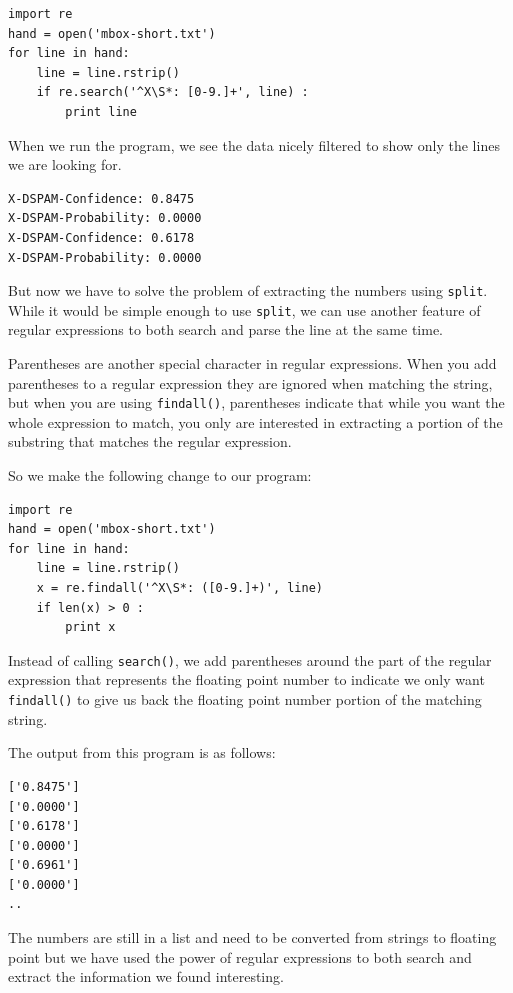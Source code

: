 \documentclass[11pt]{book}
\begin{document}
\beforeverb
\begin{verbatim}
import re
hand = open('mbox-short.txt')
for line in hand:
    line = line.rstrip()
    if re.search('^X\S*: [0-9.]+', line) :
        print line
\end{verbatim}
\afterverb
%
When we run the program, we see the data nicely filtered to show 
only the lines we are looking for.

\beforeverb
\begin{verbatim}
X-DSPAM-Confidence: 0.8475
X-DSPAM-Probability: 0.0000
X-DSPAM-Confidence: 0.6178
X-DSPAM-Probability: 0.0000
\end{verbatim}
\afterverb
%
But now we have to solve the problem of extracting the numbers using {\tt split}.  While it would be simple enough to use {\tt split}, we can use another feature of regular expressions to both search and parse the line at the same time.

Parentheses are another special character in regular expressions.  When you add parentheses to a regular expression they are ignored when matching the string, but when you are using {\tt findall()}, parentheses indicate that while you want the whole expression to match, you only are interested in extracting a portion of the substring that matches the regular expression.  

So we make the following change to our program:

\beforeverb
\begin{verbatim}
import re
hand = open('mbox-short.txt')
for line in hand:
    line = line.rstrip()
    x = re.findall('^X\S*: ([0-9.]+)', line)
    if len(x) > 0 :
        print x
\end{verbatim}
\afterverb
%
Instead of calling {\tt search()}, we add parentheses around the part of the regular expression that represents the floating point number to indicate we only want {\tt findall()} to give us back the floating point number portion of the matching string.

The output from this program is as follows:

\beforeverb
\begin{verbatim}
['0.8475']
['0.0000']
['0.6178']
['0.0000']
['0.6961']
['0.0000']
..
\end{verbatim}
\afterverb
%
The numbers are still in a list and need to be converted from strings to floating point but we have used the power of regular expressions to both search and extract the information we found interesting.
\end{document}
